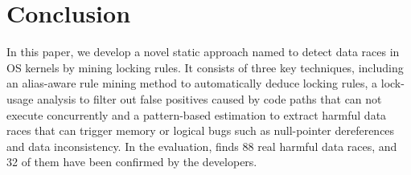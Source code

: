\section{Conclusion}
\label{sec_conclusion}

In this paper, we develop a novel static approach named \sys to detect data 
races in OS kernels by mining locking rules. It consists of three key 
techniques, including an alias-aware rule mining method to automatically deduce 
locking rules, a lock-usage analysis to filter out false positives caused by 
code paths that can not execute concurrently and a pattern-based estimation to 
extract harmful data races that can trigger memory or logical bugs such as 
null-pointer dereferences and data inconsistency. In the evaluation, \sys finds 
88 real harmful data races, and 32 of them have been confirmed by the 
developers.